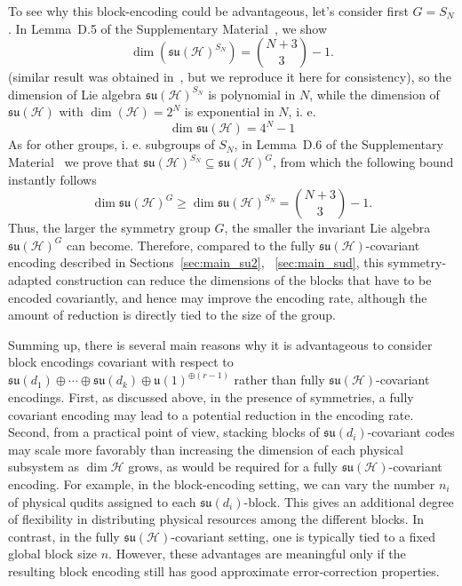 \documentclass[10pt,twocolumn,superscriptaddress,aps,amsmath,amssymb,citeautoscript,floatfix,prx,longbibliography]{revtex4-2}
\newcounter{alg}
\theoremstyle{plain}
\theoremstyle{plain}
\theoremstyle{plain}
\theoremstyle{plain}
\theoremstyle{plain}
\theoremstyle{plain}
\begin{document}
To see why this block-encoding could be advantageous, let's consider first $G=S_N$. In Lemma~D.5 of the Supplementary Material~\cite{SuppMat}, we show 
\[
    \dim\left(\mathfrak{su}(\mathcal{H})^{S_N}\right)=\binom{N+3}{3}-1.
\]
(similar result was obtained in~\cite{Albertini2018}, but we reproduce it here for consistency),
so the dimension of Lie algebra $\mathfrak{su}(\mathcal{H})^{S_N}$ is polynomial in $N$,
while the dimension of $\mathfrak{su}(\mathcal{H})$ with $\operatorname{dim}(\mathcal{H})=2^N$ is exponential in $N$, i. e.  
\[
    \operatorname{dim}\mathfrak{su}(\mathcal{H})=4^N-1
\]
As for other groups, i. e. subgroups of $S_N$, in Lemma~D.6 of the Supplementary Material~\cite{SuppMat} we prove that $\mathfrak{s} \mathfrak{u}(\mathcal{H})^{S_N} \subseteq \mathfrak{s} \mathfrak{u}(\mathcal{H})^G$, from which the following bound instantly follows
\begin{equation}\label{eq:inv_alg_dim}
    \operatorname{dim}\mathfrak{su}(\mathcal{H})^G \geq \operatorname{dim}\mathfrak{su}(\mathcal{H})^{S_N}=\binom{N+3}{3}-1 .
\end{equation}
Thus, the larger the symmetry group \(G\), the smaller the invariant Lie algebra \(\mathfrak{su}(\mathcal H)^G\) can become. Therefore, compared to the fully \(\mathfrak{su}(\mathcal H)\)-covariant encoding described in Sections~\ref{sec:main_su2}, ~\ref{sec:main_sud}, this symmetry-adapted construction can reduce the dimensions of the blocks that have to be encoded covariantly, and hence may improve the encoding rate, although the amount of reduction is directly tied to the size of the group.

Summing up, there is several main reasons why it is advantageous to consider block encodings covariant with respect to
$
    \mathfrak{su}(d_1)\oplus\cdots\oplus\mathfrak{su}(d_k)
    \oplus
    \mathfrak{u}(1)^{\oplus(r-1)}
$
rather than fully \(\mathfrak{su}(\mathcal H)\)-covariant encodings. First, as discussed above, in the presence of symmetries, a fully covariant encoding may lead to a potential reduction in the encoding rate. Second, from a practical point of view, stacking blocks of \(\mathfrak{su}(d_i)\)-covariant codes may scale more favorably than increasing the dimension of each physical subsystem as \(\dim\mathcal H\) grows, as would be required for a fully \(\mathfrak{su}(\mathcal H)\)-covariant encoding. For example, in the block-encoding setting, we can vary the number \(n_i\) of physical qudits assigned to each \(\mathfrak{su}(d_i)\)-block. This gives an additional degree of flexibility in distributing physical resources among the different blocks. In contrast, in the fully \(\mathfrak{su}(\mathcal H)\)-covariant setting, one is typically tied to a fixed global block size \(n\).
However, these advantages are meaningful only if the resulting block encoding still has good approximate error-correction properties.
\end{document}
